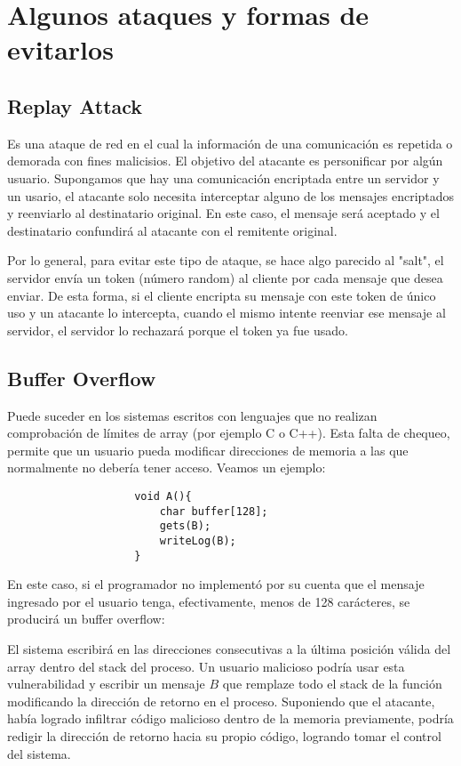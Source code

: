 \newpage
\section{Algunos ataques y formas de evitarlos}
\subsection{Replay Attack}
Es una ataque de red en el cual la información de una comunicación es repetida o demorada con fines malicisios. El objetivo del atacante es personificar por algún usuario. Supongamos que hay una comunicación encriptada entre un servidor y un usario, el atacante solo necesita interceptar alguno de los mensajes encriptados y reenviarlo al destinatario original. En este caso, el mensaje será aceptado y el destinatario confundirá al atacante con el remitente original.

Por lo general, para evitar este tipo de ataque, se hace algo parecido al "salt", el servidor envía un token (número random) al cliente por cada mensaje que desea enviar. De esta forma, si el cliente encripta su mensaje con este token de único uso y un atacante lo intercepta, cuando el mismo intente reenviar ese mensaje al servidor, el servidor lo rechazará porque el token
ya fue usado.

\subsection{Buffer Overflow}
Puede suceder en los sistemas escritos con lenguajes que no realizan comprobación de límites de array (por ejemplo C o C++). Esta falta de chequeo, permite que un usuario pueda modificar direcciones de memoria a las que normalmente no debería tener acceso. Veamos un ejemplo:

\begin{multicols}{2}
	\begin{verbatim}
					void A(){
						char buffer[128];
						gets(B);
						writeLog(B);
					}
	\end{verbatim}
	\columnbreak
	En este caso, si el programador no implementó por su cuenta que el mensaje ingresado por el usuario tenga, efectivamente, menos de 128 carácteres, se producirá un buffer overflow:
\end{multicols}
El sistema escribirá en las direcciones consecutivas a la última posición válida del array dentro del stack del proceso. Un usuario malicioso podría usar esta vulnerabilidad y escribir un mensaje $B$ que remplaze todo el stack de la función modificando la dirección de retorno en el proceso. Suponiendo que el atacante, había logrado infiltrar código malicioso dentro de la memoria previamente, podría redigir la dirección de retorno hacia su propio código, logrando tomar el control del sistema.


